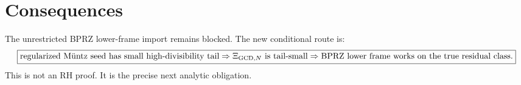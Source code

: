 \documentclass[11pt]{article}
\begin{document}
\section{Consequences}
The unrestricted BPRZ lower-frame import remains blocked. The new conditional route is:
\[
\boxed{
\text{regularized M\"untz seed has small high-divisibility tail}
\Rightarrow
\Xi_{{\rm GCD},N}\text{ is tail-small}
\Rightarrow
\text{BPRZ lower frame works on the true residual class.}
}
\]
This is not an RH proof. It is the precise next analytic obligation.
\end{document}
